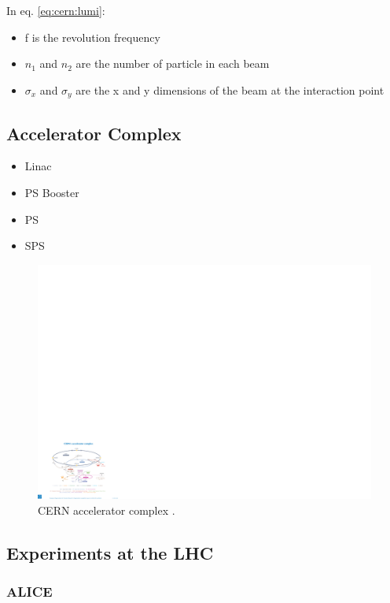 In eq. \ref{eq:cern:lumi}:
\begin{itemize}
\item f is the revolution frequency
\item $n_1$ and $n_2$ are the number of particle in each beam
\item $\sigma_x$ and $\sigma_y$ are the x and y dimensions of the beam at the interaction point
\end{itemize}


\subsection{Accelerator Complex}

\begin{itemize}
\item Linac
\item PS Booster
\item PS
\item SPS
\end{itemize}

\begin{figure}[ht]
\centering
\includegraphics[width=1\textwidth]{figures/lhc/acc_complex.pdf}
\caption{CERN accelerator complex \cite{Christiane:1260465}.}
\label{fig:lhc:acc}
\end{figure}

\subsection{Experiments at the LHC}

\subsubsection*{ALICE}

